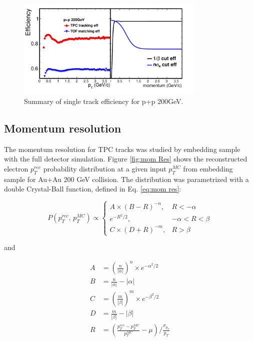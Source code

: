 \begin{figure}
\begin{centering}
\includegraphics[width=0.8\textwidth]{fig/3.Analysis/Efficiency/single_eff_pp}
\par\end{centering}

\protect\caption{Summary of single track efficiency for p+p 200GeV.}


\label{fig:single eff pp}
\end{figure}



\subsection{Momentum resolution}

The momentum resolution for TPC tracks was studied by embedding sample
with the full detector simulation. Figure \ref{fig:mom Res} shows
the reconstructed electron $p_{T}^{rec}$ probability distribution
at a given input $p_{T}^{MC}$ from embedding sample for Au+Au 200
GeV collision. The distribution was parametrized with a double Crystal-Ball
function, defined in Eq. \ref{eq:mom res}:

\begin{equation}
P(p_{T}^{rec},\, p_{T}^{MC})\propto\begin{cases}
A\times(B-R)^{-n}, & R<-\alpha\\
e^{-R^{2}/2}, & -\alpha<R<\beta\\
C\times(D+R)^{-m}, & R>\beta
\end{cases}\label{eq:mom res}
\end{equation}


and 

\begin{align}
A & =(\frac{n}{|\alpha|})^{n}\times e^{-\alpha^{2}/2}\nonumber \\
B & =\frac{n}{|\alpha|}-|\alpha|\nonumber \\
C & =(\frac{m}{|\beta|})^{m}\times e^{-\beta^{2}/2}\label{eq: mom res2}\\
D & =\frac{m}{|\beta|}-|\beta|\nonumber \\
R & =(\frac{p_{T}^{rec}-p_{T}^{MC}}{p_{T}^{MC}}-\mu)/\frac{\sigma_{p_{T}}}{p_{T}}\nonumber 
\end{align}


